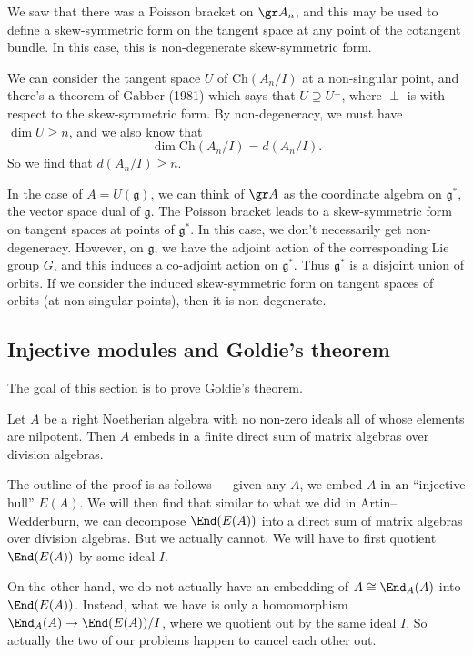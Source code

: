 \documentclass[a4paper]{article}
\begin{document}
We saw that there was a Poisson bracket on $\gr A_n$, and this may be used to define a skew-symmetric form on the tangent space at any point of the cotangent bundle. In this case, this is non-degenerate skew-symmetric form.

We can consider the tangent space $U$ of $\mathrm{Ch} (A_n/I)$ at a non-singular point, and there's a theorem of Gabber (1981) which says that $U \supseteq U^\perp$, where $\perp$ is with respect to the skew-symmetric form. By non-degeneracy, we must have $\dim U \geq n$, and we also know that
\[
  \dim \mathrm{Ch}(A_n/I) = d(A_n/I).
\]
So we find that $d(A_n/I) \geq n$.

In the case of $A = U(\mathfrak{g})$, we can think of $\gr A$ as the coordinate algebra on $\mathfrak{g}^*$, the vector space dual of $\mathfrak{g}$. The Poisson bracket leads to a skew-symmetric form on tangent spaces at points of $\mathfrak{g}^*$. In this case, we don't necessarily get non-degeneracy. However, on $\mathfrak{g}$, we have the adjoint action of the corresponding Lie group $G$, and this induces a co-adjoint action on $\mathfrak{g}^*$. Thus $\mathfrak{g}^*$ is a disjoint union of orbits. If we consider the induced skew-symmetric form on tangent spaces of orbits (at non-singular points), then it is non-degenerate.

\subsection{Injective modules and Goldie's theorem}
The goal of this section is to prove Goldie's theorem.
\begin{thm}
  Let $A$ be a right Noetherian algebra with no non-zero ideals all of whose elements are nilpotent. Then $A$ embeds in a finite direct sum of matrix algebras over division algebras.
\end{thm}
The outline of the proof is as follows --- given any $A$, we embed $A$ in an ``injective hull'' $E(A)$. We will then find that similar to what we did in Artin--Wedderburn, we can decompose $\End(E(A))$ into a direct sum of matrix algebras over division algebras. But we actually cannot. We will have to first quotient $\End(E(A))$ by some ideal $I$.

On the other hand, we do not actually have an embedding of $A \cong \End_A(A)$ into $\End(E(A))$. Instead, what we have is only a homomorphism $\End_A(A) \to \End(E(A))/I$, where we quotient out by the same ideal $I$. So actually the two of our problems happen to cancel each other out.
\end{document}
